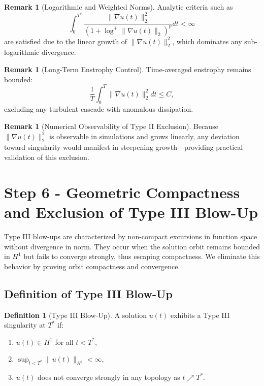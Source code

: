 \documentclass[11pt]{article}
\theoremstyle{definition}
\newtheorem{definition}[theorem]{Definition}
\newtheorem{remark}[theorem]{Remark}
\begin{document}
\begin{remark}[Logarithmic and Weighted Norms]
Analytic criteria such as
\[
\int_0^{T^*} \frac{\|\nabla u(t)\|_2^2}{(1 + \log^+ \|\nabla u(t)\|_2)^p} dt < \infty
\]
are satisfied due to the linear growth of $\|\nabla u(t)\|_2^2$, which dominates any sub-logarithmic divergence.
\end{remark}

\begin{remark}[Long-Term Enstrophy Control]
Time-averaged enstrophy remains bounded:
\[
\frac{1}{T} \int_0^T \|\nabla u(t)\|_2^2 dt \le C,
\]
excluding any turbulent cascade with anomalous dissipation.
\end{remark}

\begin{remark}[Numerical Observability of Type II Exclusion]
Because $\|\nabla u(t)\|_2^2$ is observable in simulations and grows linearly, any deviation toward singularity would manifest in steepening growth—providing practical validation of this exclusion.
\end{remark}



\section{Step 6 - Geometric Compactness and Exclusion of Type III Blow-Up}
\label{sec:step6}

Type III blow-ups are characterized by non-compact excursions in function space without divergence in norm. They occur when the solution orbit remains bounded in $H^1$ but fails to converge strongly, thus escaping compactness. We eliminate this behavior by proving orbit compactness and convergence.

\subsection*{Definition of Type III Blow-Up}
\begin{definition}[Type III Blow-Up]
A solution $u(t)$ exhibits a Type III singularity at $T^*$ if:
\begin{enumerate}
  \item $u(t) \in H^1$ for all $t < T^*$,
  \item $\sup_{t < T^*} \|u(t)\|_{H^1} < \infty$,
  \item $u(t)$ does not converge strongly in any topology as $t \nearrow T^*$.
\end{enumerate}
\end{definition}
\end{document}
